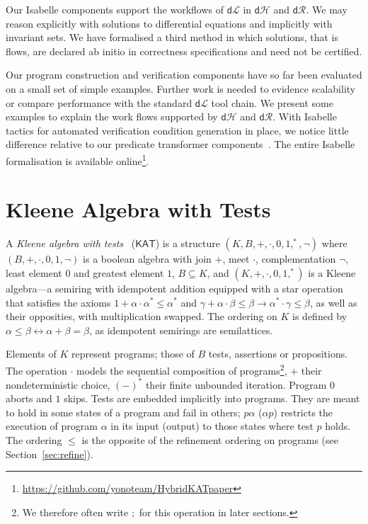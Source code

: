 \documentclass[envcountsame,envcountsect]{llncs}
\newcommand{\KAT}{\mathsf{KAT}}
\newcommand{\dL}{\mathsf{d}\mathcal{L}}
\newcommand{\dH}{\mathsf{d}\mathcal{H}}
\newcommand{\dR}{\mathsf{d}\mathcal{R}}
\begin{document}
Our Isabelle components support the  workflows of $\dL$ in $\dH$
and $\dR$. We may reason explicitly with solutions to differential
equations and implicitly with invariant sets. We have formalised a third
method in which solutions, that is flows, are declared ab initio in
correctness specifications and need not be certified.

Our program construction and verification components have so far been
evaluated on a small set of simple examples. Further work is needed to
evidence scalability or compare performance with the standard $\dL$
tool chain. We present some examples to explain the work flows
supported by $\dH$ and $\dR$. With Isabelle tactics for automated
verification condition generation in place, we notice little
difference relative to our predicate transformer
components~\cite{MuniveS19}.  The entire Isabelle formalisation is
available
online\footnote{\url{https://github.com/yonoteam/HybridKATpaper}}.



\section{Kleene Algebra with Tests}\label{sec:kat} 

A \emph{Kleene algebra with tests}~\cite{Kozen97} ($\KAT$) is a
structure $(K,B,+,\cdot,0,1,^\ast,\neg)$ where $(B,+,\cdot,0,1,\neg)$
is a boolean algebra with join $+$, meet $\cdot$, complementation
$\neg$, least element $0$ and greatest element $1$, $B\subseteq K$,
and $(K,+,\cdot,0,1,^\ast)$ is a Kleene algebra---a semiring with
idempotent addition equipped with a star operation that satisfies the
axioms $1+\alpha\cdot\alpha^\ast \le \alpha^\ast$ and
$\gamma+\alpha\cdot \beta\le \beta\rightarrow \alpha^\ast \cdot
\gamma\le \beta$,
as well as their opposities, with multiplication swapped.  The
ordering on $K$ is defined by
$\alpha\le \beta\leftrightarrow \alpha+\beta=\beta$, as idempotent
semirings are semilattices.

Elements of $K$ represent programs; those of $B$ tests, assertions or
propositions.  The operation $\cdot$ models the sequential composition
of programs\footnote{We therefore often write $;$ for this operation in later sections.}, $+$ their nondeterministic choice, $(-)^\ast$ their
finite unbounded iteration. Program $0$ aborts and $1$ skips.  Tests
are embedded implicitly into programs. They are meant to hold in some
states of a program and fail in others; $p\alpha$ ($\alpha p$)
restricts the execution of program $\alpha$ in its input (output) to
those states where test $p$ holds. The ordering $\le$ is the opposite
of the refinement ordering on programs (see Section~\ref{sec:refine}).
\end{document}
